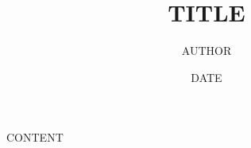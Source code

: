 \documentclass[12pt,a4paper]{article}
\title{{TITLE}}
\author{{AUTHOR}}
\date{{DATE}}
\begin{document}
\maketitle
\tableofcontents
\newpage

{CONTENT}
\end{document}
